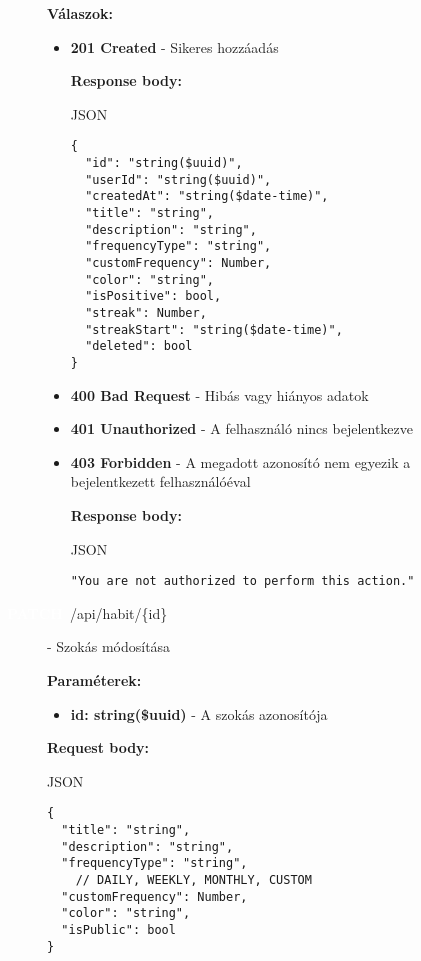\documentclass[12pt]{report}
\newcommand{\httpPatch}[1]{\colorbox{patchColor}{\textbf{\textcolor{white}{PATCH}}}~#1}
\begin{document}
\begin{description}
    \vspace{0.5cm}
    \textbf{Válaszok:}
    \begin{itemize}
      \item \textbf{201 Created} - Sikeres hozzáadás

        \textbf{Response body:}
        \begin{codeblock}{JSON}
          \begin{verbatim}
{
  "id": "string($uuid)",
  "userId": "string($uuid)",
  "createdAt": "string($date-time)",
  "title": "string",
  "description": "string",
  "frequencyType": "string",
  "customFrequency": Number,
  "color": "string",
  "isPositive": bool,
  "streak": Number,
  "streakStart": "string($date-time)",
  "deleted": bool
}
          \end{verbatim}
        \end{codeblock}

      \item \textbf{400 Bad Request} - Hibás vagy hiányos adatok
      
      \item \textbf{401 Unauthorized} - A felhasználó nincs bejelentkezve

      \item \textbf{403 Forbidden} - A megadott azonosító nem egyezik a 
      \hfill \\ bejelentkezett felhasználóéval
      
        \textbf{Response body:}
        \begin{codeblock}{JSON}
          \begin{verbatim}
"You are not authorized to perform this action."
          \end{verbatim}
        \end{codeblock}
    \end{itemize}

  \item[\httpPatch{/api/habit/\{id\}}] - Szokás módosítása
  
    \vspace{0.5cm}
    \textbf{Paraméterek:}
    \begin{itemize}
      \item \textbf{id: string(\$uuid)} - A szokás azonosítója
    \end{itemize}

    \vspace{0.5cm}
    \textbf{Request body:}
    \begin{codeblock}{JSON}
      \begin{verbatim}
{
  "title": "string",
  "description": "string",
  "frequencyType": "string",
    // DAILY, WEEKLY, MONTHLY, CUSTOM
  "customFrequency": Number,
  "color": "string",
  "isPublic": bool
}
      \end{verbatim}
    \end{codeblock}


\end{description}
\end{document}
